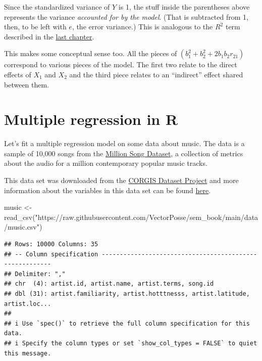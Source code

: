 \documentclass[
]{book}
\newenvironment{Shaded}{\begin{snugshade}}{\end{snugshade}}
\newcommand{\FunctionTok}[1]{\textcolor[rgb]{0.00,0.00,0.00}{#1}}
\newcommand{\NormalTok}[1]{#1}
\newcommand{\OtherTok}[1]{\textcolor[rgb]{0.56,0.35,0.01}{#1}}
\newcommand{\StringTok}[1]{\textcolor[rgb]{0.31,0.60,0.02}{#1}}
\begin{document}
Since the standardized variance of \(Y\) is 1, the stuff inside the parentheses above represents the variance \emph{accounted for by the model}. (That is subtracted from 1, then, to be left with \(e\), the error variance.) This is analogous to the \(R^{2}\) term described in the \protect\hyperlink{simple-coefficients-correlation}{last chapter}.

This makes some conceptual sense too. All the pieces of \(\left(b_{1}^{2} + b_{2}^{2} + 2b_{1}b_{2} r_{21}\right)\) correspond to various pieces of the model. The first two relate to the direct effects of \(X_{1}\) and \(X_{2}\) and the third piece relates to an ``indirect'' effect shared between them.

\hypertarget{multiple-r}{%
\section{Multiple regression in R}\label{multiple-r}}

Let's fit a multiple regression model on some data about music. The data is a sample of 10,000 songs from the \href{http://millionsongdataset.com/}{Million Song Dataset}, a collection of metrics about the audio for a million contemporary popular music tracks.

This data set was downloaded from the \href{https://corgis-edu.github.io/corgis/csv/}{CORGIS Dataset Project} and more information about the variables in this data set can be found \href{https://corgis-edu.github.io/corgis/csv/music/}{here}.

\begin{Shaded}
\begin{Highlighting}[]
\NormalTok{music }\OtherTok{\textless{}{-}} \FunctionTok{read\_csv}\NormalTok{(}\StringTok{"https://raw.githubusercontent.com/VectorPosse/sem\_book/main/data/music.csv"}\NormalTok{)}
\end{Highlighting}
\end{Shaded}

\begin{verbatim}
## Rows: 10000 Columns: 35
## -- Column specification --------------------------------------------------------
## Delimiter: ","
## chr  (4): artist.id, artist.name, artist.terms, song.id
## dbl (31): artist.familiarity, artist.hotttnesss, artist.latitude, artist.loc...
## 
## i Use `spec()` to retrieve the full column specification for this data.
## i Specify the column types or set `show_col_types = FALSE` to quiet this message.
\end{verbatim}
\end{document}
